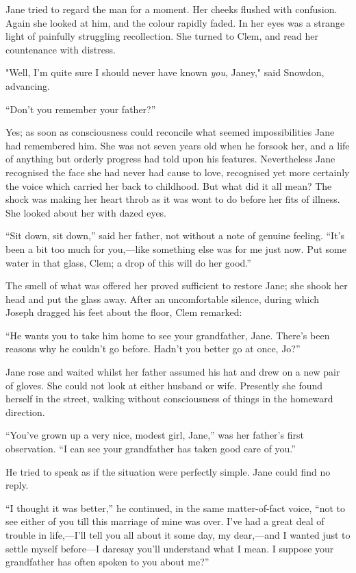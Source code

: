 Jane tried to regard the man for a moment. Her cheeks flushed with
confusion. Again she looked at him, and the colour rapidly faded. In her
eyes was a strange light of painfully struggling recollection. She
turned to Clem, and read her countenance with distress.

"Well, I'm quite sure I should never have known \emph{you}, Janey," said
Snowdon, advancing.

``Don't you remember your father?''

{\protect\hypertarget{74}{}{}}Yes; as soon as consciousness could
reconcile what seemed impossibilities Jane had remembered him. She was
not seven years old when he forsook her, and a life of anything but
orderly progress had told upon his features. Nevertheless Jane
recognised the face she had never had cause to love, recognised yet more
certainly the voice which carried her back to childhood. But what did it
all mean? The shock was making her heart throb as it was wont to do
before her fits of illness. She looked about her with dazed eyes.

``Sit down, sit down,'' said her father, not without a note of genuine
feeling. ``It's been a bit too much for you,---like something else was
for me just now. Put some water in that glass, Clem; a drop of this will
do her good.''

The smell of what was offered her proved sufficient to restore Jane; she
shook her head and put the glass away. After an uncomfortable silence,
during which Joseph dragged his feet about the floor, Clem remarked:

{\protect\hypertarget{75}{}{}}``He wants you to take him home to see
your grandfather, Jane. There's been reasons why he couldn't go before.
Hadn't you better go at once, Jo?''

Jane rose and waited whilst her father assumed his hat and drew on a new
pair of gloves. She could not look at either husband or wife. Presently
she found herself in the street, walking without consciousness of things
in the homeward direction.

``You've grown up a very nice, modest girl, Jane,'' was her father's
first observation. ``I can see your grandfather has taken good care of
you.''

He tried to speak as if the situation were perfectly simple. Jane could
find no reply.

``I thought it was better,'' he continued, in the same matter-of-fact
voice, ``not to see either of you till this marriage of mine was over.
I've had a great deal of trouble in life,---I'll tell you all about it
some day, my dear,---and I wanted just to settle myself before---I
daresay you'll understand what I mean. I
{\protect\hypertarget{76}{}{}}suppose your grandfather has often spoken
to you about me?''

